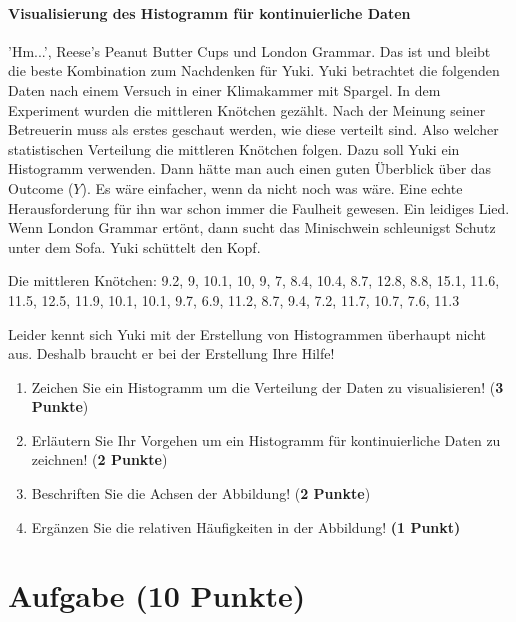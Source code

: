 \documentclass[a4paper, 9pt]{scrartcl}\usepackage[]{graphicx}\usepackage[]{xcolor}
\begin{document}
\ifcollection
\paragraph{Visualisierung des Histogramm für kontinuierliche Daten}
\fi

'Hm...', Reese's Peanut Butter Cups und London Grammar. Das ist und bleibt die beste Kombination zum Nachdenken für Yuki. Yuki betrachtet die folgenden Daten nach einem Versuch in einer Klimakammer mit Spargel. In dem Experiment wurden die mittleren Knötchen gezählt. Nach der Meinung seiner Betreuerin muss als erstes geschaut werden, wie diese verteilt sind. Also welcher statistischen Verteilung die mittleren Knötchen folgen. Dazu soll Yuki ein Histogramm verwenden. Dann hätte man auch einen guten Überblick über das Outcome ($Y$). Es wäre einfacher, wenn da nicht noch was wäre. Eine echte Herausforderung für ihn war schon immer die Faulheit gewesen. Ein leidiges Lied. Wenn London Grammar ertönt, dann sucht das Minischwein schleunigst Schutz unter dem Sofa. Yuki schüttelt den Kopf.

\begin{center}
Die mittleren Knötchen: 9.2, 9, 10.1, 10, 9, 7, 8.4, 10.4, 8.7, 12.8, 8.8, 15.1, 11.6, 11.5, 12.5, 11.9, 10.1, 10.1, 9.7, 6.9, 11.2, 8.7, 9.4, 7.2, 11.7, 10.7, 7.6, 11.3
\end{center}

Leider kennt sich Yuki mit der Erstellung von Histogrammen überhaupt nicht aus. Deshalb braucht er bei der Erstellung Ihre Hilfe!

\begin{enumerate}
\item Zeichen Sie ein Histogramm um die Verteilung der Daten zu visualisieren! (\textbf{3 Punkte})
 \item Erläutern Sie Ihr Vorgehen um ein Histogramm für kontinuierliche Daten zu zeichnen!  (\textbf{2 Punkte})
\item Beschriften Sie die Achsen der Abbildung! (\textbf{2 Punkte})
\item Ergänzen Sie die relativen Häufigkeiten in der Abbildung! \textbf{(1 Punkt)}  
\end{enumerate}

 
\clearpage

\section{Aufgabe \hfill (10 Punkte)}
\end{document}
